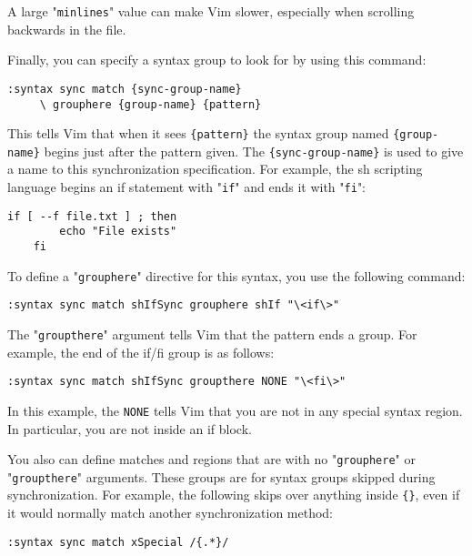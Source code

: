 A large "\texttt{minlines}" value can make Vim slower, especially when scrolling backwards in the file.

Finally, you can specify a syntax group to look for by using this command:

\begin{Verbatim}[samepage=true]
 :syntax sync match {sync-group-name}
     \ grouphere {group-name} {pattern}
\end{Verbatim}

This tells Vim that when it sees \texttt{\{pattern\}} the syntax group named \texttt{\{group-name\}} begins just after the pattern given.
The \texttt{\{sync-group-name\}} is used to give a name to this synchronization specification.
For example, the sh scripting language begins an if statement with "\texttt{if}" and ends it with "\texttt{fi}":

\begin{Verbatim}[samepage=true]
    if [ --f file.txt ] ; then 
        echo "File exists" 
    fi 
\end{Verbatim}

To define a "\texttt{grouphere}" directive for this syntax, you use the following command:

\begin{Verbatim}[samepage=true]
 :syntax sync match shIfSync grouphere shIf "\<if\>"
\end{Verbatim}

The "\texttt{groupthere}" argument tells Vim that the pattern ends a group.
For example, the end of the if/fi group is as follows:

\begin{Verbatim}[samepage=true]
 :syntax sync match shIfSync groupthere NONE "\<fi\>"
\end{Verbatim}

In this example, the \texttt{NONE} tells Vim that you are not in any special syntax region.
In particular, you are not inside an if block.

You also can define matches and regions that are with no "\texttt{grouphere}" or "\texttt{groupthere}" arguments.
These groups are for syntax groups skipped during synchronization.
For example, the following skips over anything inside \texttt{\{\}}, even if it would normally match another synchronization method:

\begin{Verbatim}[samepage=true]
 :syntax sync match xSpecial /{.*}/
\end{Verbatim}

